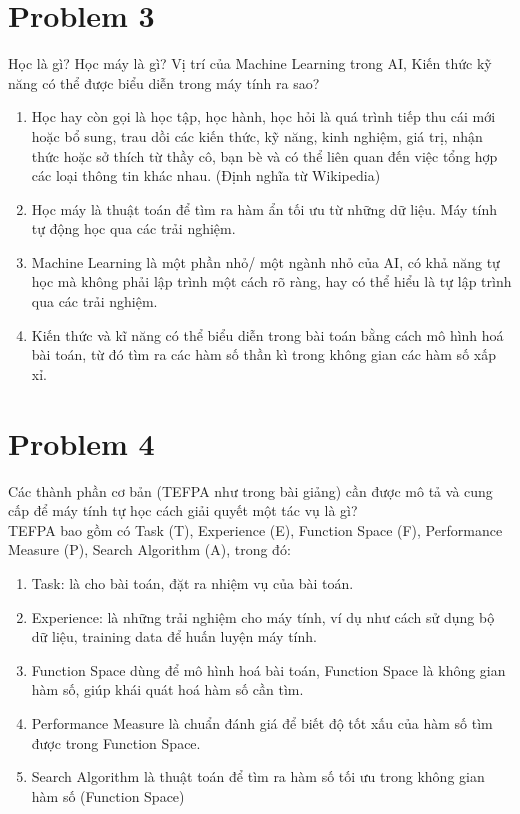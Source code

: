 \documentclass[12pt,letterpaper]{article}
\begin{document}
\section*{Problem 3}
Học là gì? Học máy là gì? Vị trí của Machine Learning trong AI, Kiến thức kỹ năng có thể được biểu diễn trong máy tính ra sao?
\begin{enumerate}
    \item
    Học hay còn gọi là học tập, học hành, học hỏi là quá trình tiếp thu cái mới hoặc bổ sung, trau dồi các kiến thức, kỹ năng, kinh nghiệm, giá trị, nhận thức hoặc sở thích từ thầy cô, bạn bè và có thể liên quan đến việc tổng hợp các loại thông tin khác nhau. (Định nghĩa từ Wikipedia)
    \item
    Học máy là thuật toán để tìm ra hàm ẩn tối ưu từ những dữ liệu. Máy tính tự động học qua các trải nghiệm.
    \item
    Machine Learning là một phần nhỏ/ một ngành nhỏ của AI, có khả năng tự học mà không phải lập trình một cách rõ ràng, hay có thể hiểu là tự lập trình qua các trải nghiệm.
    \item
    Kiến thức và kĩ năng có thể biểu diễn trong bài toán bằng cách mô hình hoá bài toán, từ đó tìm ra các hàm số thần kì trong không gian các hàm số xấp xỉ.
\end{enumerate}
\section*{Problem 4}
Các thành phần cơ bản (TEFPA như trong bài giảng) cần được mô tả và cung cấp để máy tính tự học cách giải quyết một tác vụ là gì?
\\
TEFPA bao gồm có Task (T), Experience (E), Function Space (F), Performance Measure (P), Search Algorithm (A), trong đó:
\begin{enumerate}
    \item Task: là cho bài toán, đặt ra nhiệm vụ của bài toán.
    \item Experience: là những trải nghiệm cho máy tính, ví dụ như cách sử dụng bộ dữ liệu, training data để huấn luyện máy tính.
    \item Function Space dùng để mô hình hoá bài toán, Function Space là không gian hàm số, giúp khái quát hoá hàm số cần tìm.
    \item Performance Measure là chuẩn đánh giá để biết độ tốt xấu của hàm số tìm được trong Function Space.
    \item Search Algorithm là thuật toán để tìm ra hàm số tối ưu trong không gian hàm số (Function Space)
\end{enumerate}
\end{document}
